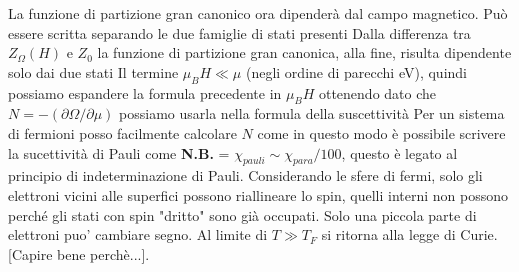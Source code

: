La funzione di partizione gran canonico ora dipender\`a dal campo magnetico. Pu\`o essere scritta separando le due famiglie di stati presenti
Dalla differenza tra $Z_{\Omega} (H)$ e $Z_0$ la funzione di partizione gran canonica, alla fine, risulta dipendente solo dai due stati
Il termine $\mu_BH \ll \mu$ (negli ordine di parecchi eV), quindi possiamo espandere la formula precedente in $\mu_BH$ ottenendo
dato che $N = - (\partial\Omega / \partial\mu)$ possiamo usarla nella formula della suscettivit\`a 
Per un sistema di fermioni posso facilmente calcolare $N$ come 
in questo modo \`e possibile scrivere la sucettivit\`a di Pauli come
\textbf{N.B.} = $\chi_{pauli} \sim \chi_{para}/100$, questo \`e legato al principio di indeterminazione di Pauli. Considerando le sfere di fermi, solo gli elettroni vicini alle superfici possono riallineare lo spin, quelli interni non possono perch\'e gli stati con spin "dritto" sono gi\`a occupati. Solo una piccola parte di elettroni puo' cambiare segno. Al limite di $T \gg T_F$ si ritorna alla legge di Curie. [Capire bene perch\`e...]. 
